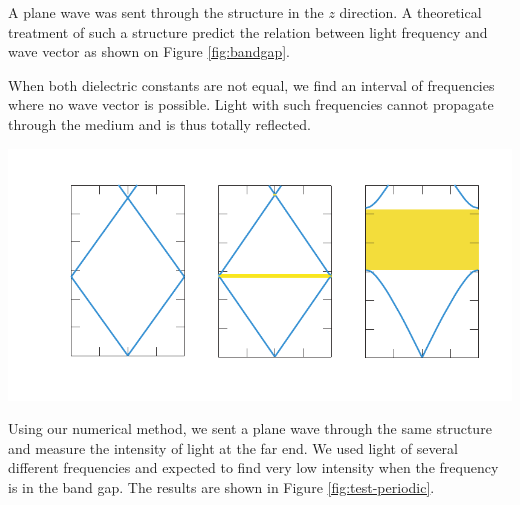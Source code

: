 \documentclass[a4paper,10pt]{article}
\renewenvironment{figure}
  {\par\medskip\noindent\minipage{\linewidth}}
  {\endminipage\par\medskip}
\begin{document}
\begin{multicols}{2}
\begin{figure}
 \centering
  \resizebox{\textwidth}{!}{}
  \label{fig:periodic-structure}
\end{figure}

A plane wave was sent through the structure in the $z$ direction. 
A theoretical treatment of such a structure predict the relation between light frequency and wave vector as shown on Figure \ref{fig:bandgap}. 

When both dielectric constants are not equal, we find an interval of frequencies where no wave vector is possible. 
Light with such frequencies cannot propagate through the medium and is thus totally reflected. 

\begin{figure}
 \centering
 \includegraphics[width=\textwidth]{bandgap}
  \label{fig:bandgap}
\end{figure}

Using our numerical method, we sent a plane wave through the same structure and measure the intensity of light at the far end. 
We used light of several different frequencies and expected to find very low intensity when the frequency is in the band gap. 
The results are shown in Figure \ref{fig:test-periodic}. 

\begin{figure}
 \centering
  \resizebox{\textwidth}{!}{}
  \label{fig:test-periodic}
\end{figure}


\end{multicols}
\end{document}
